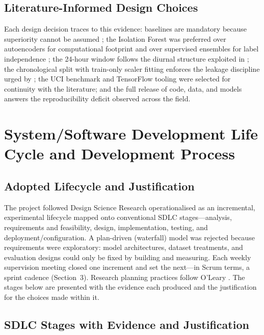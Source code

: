 \documentclass[11pt,a4paper]{article}
\begin{document}
\subsection{Literature-Informed Design Choices}
Each design decision traces to this evidence: baselines are mandatory because
superiority cannot be assumed \cite{makridakis2018statistical}; the Isolation
Forest was preferred over autoencoders for computational footprint
\cite{jamshidi2025lightweight} and over supervised ensembles for label
independence \cite{chen2024effective}; the 24-hour window follows the diurnal
structure exploited in \cite{kong2017short}; the chronological split with
train-only scaler fitting enforces the leakage discipline urged by
\cite{makridakis2018statistical}; the UCI benchmark \cite{hebrail2012individual}
and TensorFlow tooling \cite{abadi2016tensorflow} were selected for continuity
with the literature; and the full release of code, data, and models answers the
reproducibility deficit observed across the field.

\section{System/Software Development Life Cycle and Development Process}

\subsection{Adopted Lifecycle and Justification}
The project followed Design Science Research
\cite{hevner2004design,peffers2007design} operationalised as an incremental,
experimental lifecycle mapped onto conventional SDLC stages---analysis,
requirements and feasibility, design, implementation, testing, and
deployment/configuration. A plan-driven (waterfall) model was rejected because
requirements were exploratory: model architectures, dataset treatments, and
evaluation designs could only be fixed by building and measuring. Each weekly
supervision meeting closed one increment and set the next---in Scrum terms, a
sprint cadence (Section~3). Research planning practices follow O'Leary
\cite{zina2021essential}. The stages below are presented with the evidence each
produced and the justification for the choices made within it.

\subsection{SDLC Stages with Evidence and Justification}
\end{document}
